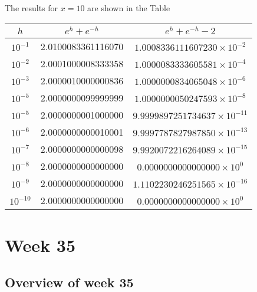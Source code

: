 \documentclass[%
oneside,                 %
final,                   %
10pt]{article}
\begin{document}
\begin{block}{}
The results for $x=10$ are shown in the Table


{\footnotesize
\begin{tabular}{ccc}
\hline
\multicolumn{1}{c}{ $h$ } & \multicolumn{1}{c}{ $e^{h}+e^{-h}$ } & \multicolumn{1}{c}{ $e^{h}+e^{-h}-2$ } \\
\hline
$10^{-1}$  & 2.0100083361116070 & $1.0008336111607230\times 10^{-2}$  \\
$10^{-2}$  & 2.0001000008333358 & $1.0000083333605581\times 10^{-4}$  \\
$10^{-3}$  & 2.0000010000000836 & $1.0000000834065048\times 10^{-6}$  \\
$10^{-5}$  & 2.0000000099999999 & $1.0000000050247593\times 10^{-8}$  \\
$10^{-5}$  & 2.0000000001000000 & $9.9999897251734637\times 10^{-11}$ \\
$10^{-6}$  & 2.0000000000010001 & $9.9997787827987850\times 10^{-13}$ \\
$10^{-7}$  & 2.0000000000000098 & $9.9920072216264089\times 10^{-15}$ \\
$10^{-8}$  & 2.0000000000000000 & $0.0000000000000000\times 10^{0}$   \\
$10^{-9}$  & 2.0000000000000000 & $1.1102230246251565\times 10^{-16}$ \\
$10^{-10}$ & 2.0000000000000000 & $0.0000000000000000\times 10^{0}$   \\
\hline
\end{tabular}
}

\noindent
\end{block}


\section{Week 35}

\subsection{Overview of week 35}
\end{document}
